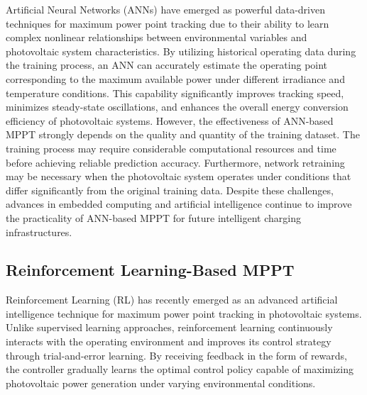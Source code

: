 Artificial Neural Networks (ANNs) have emerged as powerful data-driven techniques for maximum power point tracking due to their ability to learn complex nonlinear relationships between environmental variables and photovoltaic system characteristics. By utilizing historical operating data during the training process, an ANN can accurately estimate the operating point corresponding to the maximum available power under different irradiance and temperature conditions. This capability significantly improves tracking speed, minimizes steady-state oscillations, and enhances the overall energy conversion efficiency of photovoltaic systems.
\newpage
However, the effectiveness of ANN-based MPPT strongly depends on the quality and quantity of the training dataset. The training process may require considerable computational resources and time before achieving reliable prediction accuracy. Furthermore, network retraining may be necessary when the photovoltaic system operates under conditions that differ significantly from the original training data. Despite these challenges, advances in embedded computing and artificial intelligence continue to improve the practicality of ANN-based MPPT for future intelligent charging infrastructures.
\subsection{Reinforcement Learning-Based MPPT}

Reinforcement Learning (RL) has recently emerged as an advanced artificial intelligence technique for maximum power point tracking in photovoltaic systems. Unlike supervised learning approaches, reinforcement learning continuously interacts with the operating environment and improves its control strategy through trial-and-error learning. By receiving feedback in the form of rewards, the controller gradually learns the optimal control policy capable of maximizing photovoltaic power generation under varying environmental conditions.

